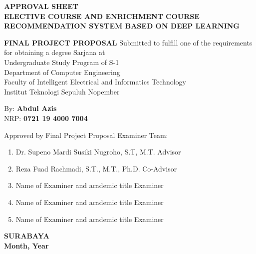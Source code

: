 {
\begin{center}
    \uppercase{\textbf{\large Approval Sheet}} \\

    \vspace*{10mm}
    \uppercase{\textbf{Elective Course and Enrichment course recommendation system based on Deep Learning}}
    \vspace*{10mm}

    {
        \uppercase{\textbf{Final Project Proposal}}
        Submitted to fulfill one of the requirements                  \\
        for obtaining a degree Sarjana at                             \\
        Undergraduate Study Program of S-1                            \\
        Department of Computer Engineering                            \\
        Faculty of Intelligent Electrical and Informatics Technology  \\
        Institut Teknologi Sepuluh Nopember                           \\
    }

    \vspace*{1.5cm}
    By: \textbf{Abdul Azis}                                       \\
    NRP: \textbf{0721 19 4000 7004}                               \\
    \vspace*{1.5cm}

    Approved by Final Project Proposal Examiner Team:             \\
    \vspace*{5mm}

    \begin{enumerate}
        \setlength\itemsep{1.5em}
        \item Dr. Supeno Mardi Susiki Nugroho, S.T, M.T. \hfill Advisor
        \item Reza Fuad Rachmadi, S.T., M.T., Ph.D. \hfill Co-Advisor
        \item Name of Examiner and academic title \hfill Examiner
        \item Name of Examiner and academic title \hfill Examiner
        \item Name of Examiner and academic title \hfill Examiner
    \end{enumerate}

    \vspace*{1.5cm}
    \uppercase{\textbf{surabaya}}                      \\
    \textbf{Month, Year}                               \\

\end{center}
}